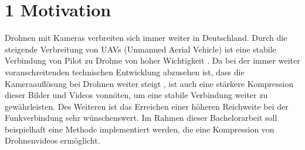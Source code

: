 \documentclass[a4paper,11pt,pdftex, parskip]{scrreprt}
\begin{document}
\section*{1 Motivation}
Drohnen mit Kameras verbreiten sich immer weiter in Deutschland. Durch die steigende Verbreitung von UAVs (Unmanned Aerial Vehicle) ist eine stabile Verbindung von Pilot zu Drohne von hoher Wichtigkeit \citep{Nehring2021}. \newline
Da bei der immer weiter voranschreitenden technischen Entwicklung abzusehen ist, dass die Kameraauflösung bei Drohnen weiter steigt \citep{futuretech2017}, ist auch eine stärkere Kompression dieser Bilder und Videos vonnöten, um eine stabile Verbindung weiter zu gewährleisten. Des Weiteren ist das Erreichen einer höheren Reichweite bei der Funkverbindung sehr wünschenswert. \newline
Im Rahmen dieser Bachelorarbeit soll beispielhaft eine Methode implementiert werden, die eine Kompression von Drohnenvideos ermöglicht.
\end{document}
